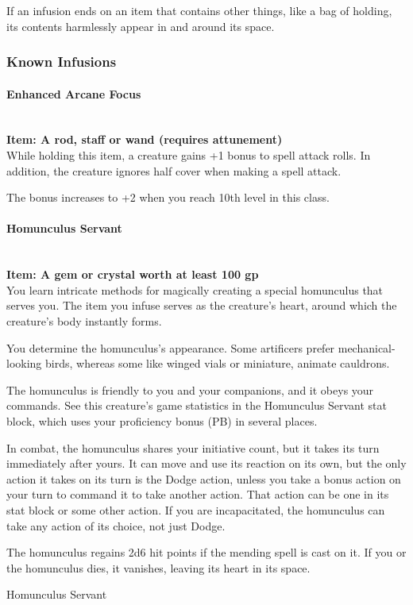 {If an infusion ends on an item that contains other things, like a bag of holding, its contents harmlessly appear in and around its space.
\subsubsection*{Known Infusions}
\paragraph*{Enhanced Arcane Focus}\hfill\\
\textbf{Item: A rod, staff or wand (requires attunement)}\\
While holding this item, a creature gains +1 bonus to spell attack rolls. In addition, the creature ignores half cover when making a spell attack.

The bonus increases to +2 when you reach 10th level in this class.\\
\paragraph*{Homunculus Servant}\hfill\\
\textbf{Item: A gem or crystal worth at least 100 gp}\\
You learn intricate methods for magically creating a special homunculus that serves you. The item you infuse serves as the creature's heart, around which the creature's body instantly forms.

You determine the homunculus's appearance. Some artificers prefer mechanical-looking birds, whereas some like winged vials or miniature, animate cauldrons.

The homunculus is friendly to you and your companions, and it obeys your commands. See this creature's game statistics in the Homunculus Servant stat block, which uses your proficiency bonus (PB) in several places.

In combat, the homunculus shares your initiative count, but it takes its turn immediately after yours. It can move and use its reaction on its own, but the only action it takes on its turn is the Dodge action, unless you take a bonus action on your turn to command it to take another action. That action can be one in its stat block or some other action. If you are incapacitated, the homunculus can take any action of its choice, not just Dodge.

The homunculus regains 2d6 hit points if the mending spell is cast on it. If you or the homunculus dies, it vanishes, leaving its heart in its space.
\begin{DndMonster}[width=0.5\textwidth]{Homunculus Servant}


\end{DndMonster}}
